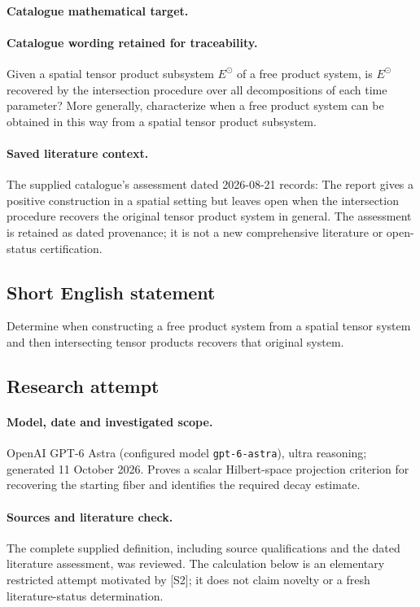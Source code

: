 \documentclass[11pt]{article}
\begin{document}
\paragraph{Catalogue mathematical target.}
\paragraph{Catalogue wording retained for traceability.}
Given a spatial tensor product subsystem $E^{\odot}$ of a free product system, is $E^{\odot}$ recovered by the intersection procedure over all decompositions of each time parameter? More generally, characterize when a free product system can be obtained in this way from a spatial tensor product subsystem.

\paragraph{Saved literature context.} The supplied catalogue's assessment dated 2026-08-21 records: The report gives a positive construction in a spatial setting but leaves open when the intersection procedure recovers the original tensor product system in general. The assessment is retained as dated provenance; it is not a new comprehensive literature or open-status certification.
\subsection{Short English statement}
Determine when constructing a free product system from a spatial tensor system and then intersecting tensor products recovers that original system.
\subsection{Research attempt}
\paragraph{Model, date and investigated scope.}
OpenAI GPT-6 Astra (configured model \texttt{gpt-6-astra}), ultra reasoning; generated 11 October 2026. Proves a scalar Hilbert-space projection criterion for recovering the starting fiber and identifies the required decay estimate.

\paragraph{Sources and literature check.}
The complete supplied definition, including source qualifications and the dated literature assessment, was reviewed. The calculation below is an elementary restricted attempt motivated by [S2]; it does not claim novelty or a fresh literature-status determination.
\end{document}
